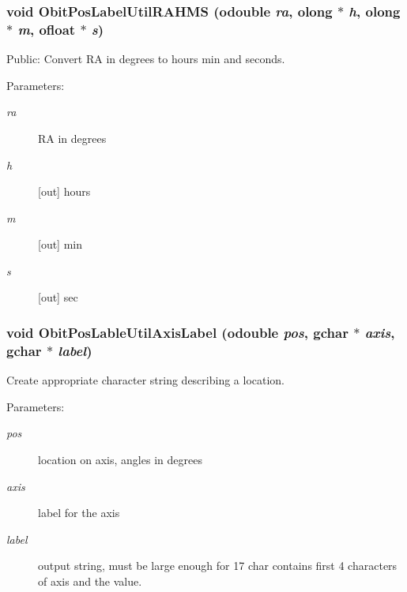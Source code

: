 \subsubsection{\setlength{\rightskip}{0pt plus 5cm}void Obit\-Pos\-Label\-Util\-RAHMS ({\bf odouble} {\em ra}, {\bf olong} $\ast$ {\em h}, {\bf olong} $\ast$ {\em m}, {\bf ofloat} $\ast$ {\em s})}\label{ObitPosLabelUtil_8c_a3}


Public: Convert RA in degrees to hours min and seconds. 

\begin{Desc}
\item[Parameters:]
\begin{description}
\item[{\em ra}]RA in degrees \item[{\em h}][out] hours \item[{\em m}][out] min \item[{\em s}][out] sec \end{description}
\end{Desc}
\subsubsection{\setlength{\rightskip}{0pt plus 5cm}void Obit\-Pos\-Lable\-Util\-Axis\-Label ({\bf odouble} {\em pos}, gchar $\ast$ {\em axis}, gchar $\ast$ {\em label})}\label{ObitPosLabelUtil_8c_a0}


Create appropriate character string describing a location. 

\begin{Desc}
\item[Parameters:]
\begin{description}
\item[{\em pos}]location on axis, angles in degrees \item[{\em axis}]label for the axis \item[{\em label}]output string, must be large enough for 17 char contains first 4 characters of axis and the value. \end{description}
\end{Desc}
